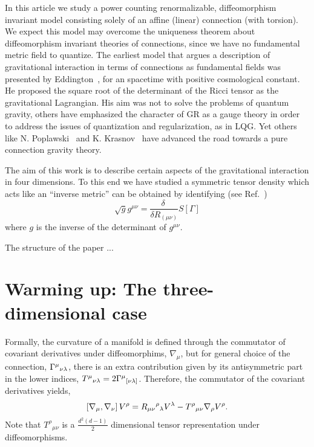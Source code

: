 \documentclass[twocolumn,aps,
  showpacs,showkeys,prd,superscriptaddress]{revtex4-1}
\begin{document}
In this article we study a power counting renormalizable,  diffeomorphism invariant model  consisting  solely of an affine (linear) connection  (with torsion). We expect  this model may  overcome  the uniqueness theorem about diffeomorphism invariant theories of connections, since we  have no fundamental metric field to quantize. The earliest model that argues  a description of gravitational interaction in terms of connections as fundamental fields  was presented by Eddington~\cite{Eddington1923math}, for an spacetime with positive cosmological constant. He proposed the square root of the determinant of the Ricci tensor as the gravitational Lagrangian. His aim was not to solve the problems of quantum gravity,  others have emphasized the character of GR as a gauge theory in order to address the issues of quantization and regularization, as in LQG. Yet others like N. Poplawski~\cite{Poplawski:2012bw} and K. Krasnov~\cite{Krasnov:2011pp} have advanced the road towards a pure connection gravity theory.

The aim of this work is to describe certain aspects of the gravitational interaction in four dimensions. To this end we have studied a  symmetric tensor density which acts like an ``inverse metric'' can be obtained by identifying (see Ref.~\cite{Poplawski:2012bw})
\begin{equation}\label{metric}
  \sqrt{g}g^{\mu\nu} = \frac{\delta\ }{\delta R_{(\mu\nu)}} S[\Gamma]
\end{equation}
where $g$ is the inverse of the determinant of $g^{\mu\nu}$.

The structure of the paper ...




\section{Warming up: The three-dimensional case}

Formally, the curvature of a manifold is defined through the commutator of covariant derivatives under diffeomorphims, $\nabla_\mu$, but for general choice of the connection, $\Gamma^\mu{}_{\nu\lambda}$, there is an extra contribution given by its antisymmetric part in the lower indices, $T^\mu{}_{\nu\lambda} = 2\Gamma^\mu{}_{[\nu\lambda]}$. Therefore, the commutator of the covariant derivatives yields,
\begin{equation}
  \left[\nabla_{{\mu}},\nabla_{{\nu}}\right]V^\rho = R_{\mu\nu}{}^\rho{}_\lambda V^\lambda - T^\rho{}_{\mu\nu}\nabla_{{\rho}}V^\rho.
  \label{curvdef}
\end{equation}
Note that $T^\rho{}_{\mu\nu}$ is a $\tfrac{d^2(d-1)}{2}$ dimensional tensor representation under diffeomorphisms.
\end{document}
